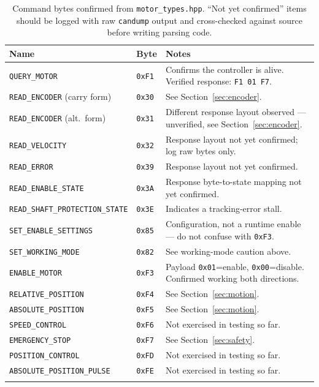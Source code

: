 \documentclass[11pt,letterpaper]{article}
\begin{document}
\begin{longtable}{lll}
\toprule
\textbf{Name} & \textbf{Byte} & \textbf{Notes} \\ \midrule
\endhead
\texttt{QUERY\_MOTOR} & \texttt{0xF1} & Confirms the controller is alive. Verified response: \texttt{F1 01 F7}. \\
\texttt{READ\_ENCODER} (carry form) & \texttt{0x30} & See Section~\ref{sec:encoder}. \\
\texttt{READ\_ENCODER} (alt.\ form) & \texttt{0x31} & Different response layout observed --- unverified, see Section~\ref{sec:encoder}. \\
\texttt{READ\_VELOCITY} & \texttt{0x32} & Response layout not yet confirmed; log raw bytes only. \\
\texttt{READ\_ERROR} & \texttt{0x39} & Response layout not yet confirmed. \\
\texttt{READ\_ENABLE\_STATE} & \texttt{0x3A} & Response byte-to-state mapping not yet confirmed. \\
\texttt{READ\_SHAFT\_PROTECTION\_STATE} & \texttt{0x3E} & Indicates a tracking-error stall. \\
\texttt{SET\_ENABLE\_SETTINGS} & \texttt{0x85} & Configuration, not a runtime enable --- do not confuse with \texttt{0xF3}. \\
\texttt{SET\_WORKING\_MODE} & \texttt{0x82} & See working-mode caution above. \\
\texttt{ENABLE\_MOTOR} & \texttt{0xF3} & Payload \texttt{0x01}=enable, \texttt{0x00}=disable. Confirmed working both directions. \\
\texttt{RELATIVE\_POSITION} & \texttt{0xF4} & See Section~\ref{sec:motion}. \\
\texttt{ABSOLUTE\_POSITION} & \texttt{0xF5} & See Section~\ref{sec:motion}. \\
\texttt{SPEED\_CONTROL} & \texttt{0xF6} & Not exercised in testing so far. \\
\texttt{EMERGENCY\_STOP} & \texttt{0xF7} & See Section~\ref{sec:safety}. \\
\texttt{POSITION\_CONTROL} & \texttt{0xFD} & Not exercised in testing so far. \\
\texttt{ABSOLUTE\_POSITION\_PULSE} & \texttt{0xFE} & Not exercised in testing so far. \\
\bottomrule
\caption{Command bytes confirmed from \texttt{motor\_types.hpp}. ``Not yet confirmed'' items should be logged with raw \texttt{candump} output and cross-checked against source before writing parsing code.}
\end{longtable}
\end{document}
